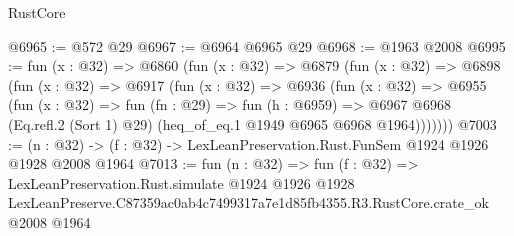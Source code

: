 \begin{lexlean}{RustCore}
\begin{coremodule}
@6965 := @572 @29
@6967 := @6964 @6965 @29
@6968 := @1963 @2008
@6995 := fun (x : @32) =>
  @6860
    (fun (x : @32) =>
    @6879
      (fun (x : @32) =>
      @6898
        (fun (x : @32) =>
        @6917
          (fun (x : @32) =>
          @6936
            (fun (x : @32) =>
            @6955
              (fun (x : @32) =>
              fun (fn : @29) =>
              fun (h : @6959) =>
              @6967 @6968 (Eq.refl.{2} (Sort 1) @29) (heq_of_eq.{1} @1949 @6965 @6968 @1964)))))))
@7003 := (n : @32) -> (f : @32) -> LexLeanPreservation.Rust.FunSem @1924 @1926 @1928 @2008 @1964
@7013 := fun (n : @32) =>
  fun (f : @32) =>
  LexLeanPreservation.Rust.simulate
    @1924
    @1926
    @1928
    LexLeanPreserve.C87359ac0ab4c7499317a7e1d85fb4355.R3.RustCore.crate_ok
    @2008
    @1964
\end{coremodule}
\end{lexlean}
